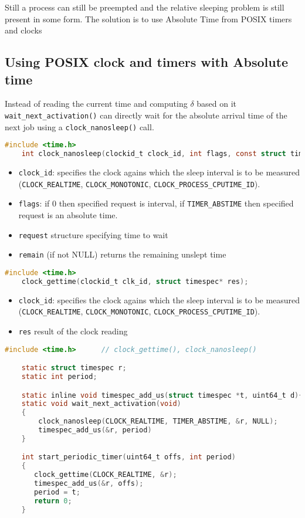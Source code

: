 Still a process can still be preempted and the relative sleeping problem is still present in some form. The solution is to use Absolute Time from POSIX timers and clocks

\subsection{Using POSIX clock and timers with Absolute time}
Instead of reading the current time and computing $\delta$ based on it \texttt{wait\_next\_activation()} can directly wait for the absolute arrival time of the next job using a \texttt{clock\_nanosleep()} call.
\begin{lstlisting}[language=C]
    #include <time.h>
    int clock_nanosleep(clockid_t clock_id, int flags, const struct timespec *request, struct timespec *remain);
\end{lstlisting}
\begin{itemize}
    \item \texttt{clock\_id}: specifies the clock agains which the sleep interval is to be measured (\texttt{CLOCK\_REALTIME}, \texttt{CLOCK\_MONOTONIC}, \texttt{CLOCK\_PROCESS\_CPUTIME\_ID}).
    \item \texttt{flags}: if 0 then specified request is interval, if \texttt{TIMER\_ABSTIME} then specified request is an absolute time.
    \item \texttt{request} structure specifying time to wait
    \item \texttt{remain} (if not NULL) returns the remaining unslept time
\end{itemize}
\begin{lstlisting}[language=C]
    #include <time.h>
    clock_gettime(clockid_t clk_id, struct timespec* res);
\end{lstlisting}
\begin{itemize}
    \item \texttt{clock\_id}: specifies the clock agains which the sleep interval is to be measured (\texttt{CLOCK\_REALTIME}, \texttt{CLOCK\_MONOTONIC}, \texttt{CLOCK\_PROCESS\_CPUTIME\_ID}).
    \item \texttt{res} result of the clock reading
\end{itemize}

\begin{lstlisting}[language=C]
    #include <time.h>      // clock_gettime(), clock_nanosleep()

    static struct timespec r;
    static int period;

    static inline void timespec_add_us(struct timespec *t, uint64_t d){ ... } // add d to timespec t by converting to us to ns
    static void wait_next_activation(void)
    {
        clock_nanosleep(CLOCK_REALTIME, TIMER_ABSTIME, &r, NULL);
        timespec_add_us(&r, period)
    }

    int start_periodic_timer(uint64_t offs, int period)
    {
       clock_gettime(CLOCK_REALTIME, &r);
       timespec_add_us(&r, offs);
       period = t;
       return 0;
    }
\end{lstlisting}

